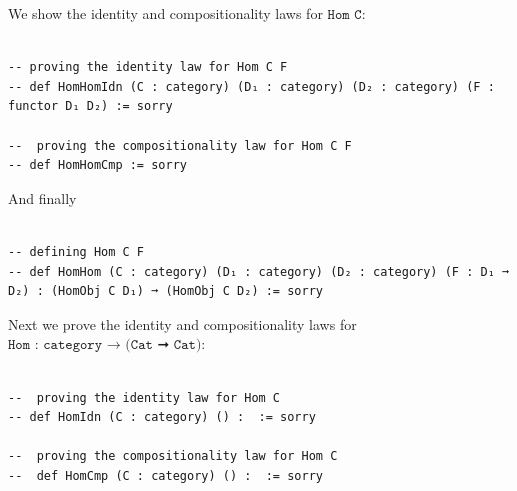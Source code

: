 \documentclass{book}
\newcounter{lcounter}
\begin{document}
We show the identity and compositionality laws for $\texttt{Hom C}$:\\

\begin{center}
\begin{tcolorbox}[width=5in,colback={white},title={\begin{center}\texttt{Lean \thelcounter} \addtocounter{lcounter}{1}  \end{center}},colbacktitle=Blue,coltitle=black]
\begin{verbatim}

-- proving the identity law for Hom C F
-- def HomHomIdn (C : category) (D₁ : category) (D₂ : category) (F : functor D₁ D₂) := sorry

--  proving the compositionality law for Hom C F
-- def HomHomCmp := sorry

\end{verbatim}%
\end{tcolorbox}
\end{center}

And finally 

\begin{center}
\begin{tcolorbox}[width=5in,colback={white},title={\begin{center}\texttt{Lean \thelcounter} \addtocounter{lcounter}{1}  \end{center}},colbacktitle=Blue,coltitle=black]
\begin{verbatim}

-- defining Hom C F
-- def HomHom (C : category) (D₁ : category) (D₂ : category) (F : D₁ ➞ D₂) : (HomObj C D₁) ➞ (HomObj C D₂) := sorry 

\end{verbatim}%
\end{tcolorbox}
\end{center}

Next we prove the identity and compositionality laws for $\texttt{Hom : category → (Cat ➞ Cat)}$:

\begin{center}
\begin{tcolorbox}[width=5in,colback={white},title={\begin{center}\texttt{Lean \thelcounter} \addtocounter{lcounter}{1}  \end{center}},colbacktitle=Blue,coltitle=black]
\begin{verbatim}

--  proving the identity law for Hom C
-- def HomIdn (C : category) () :  := sorry

--  proving the compositionality law for Hom C
--  def HomCmp (C : category) () :  := sorry

\end{verbatim}%
\end{tcolorbox}
\end{center}
\end{document}

